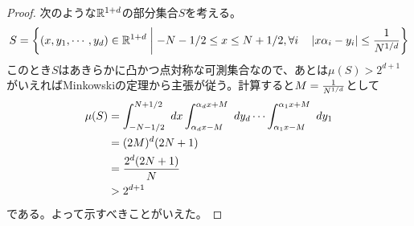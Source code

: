 \begin{proof}
次のような${\mathbb R}^{1+d}$の部分集合$S$を考える。
\[
S = \left\{ (x,y_1, \cdots , y_d) \in {\mathbb R}^{1+d} \mathrel{} \middle| \mathrel{}    -N-1/2 \leq x \leq N + 1/2, \forall i \quad  \left \lvert x {\alpha}_i - y_i \right \rvert \leq \frac{1}{N^{1/d}}  \right\}
\]
このとき$S$はあきらかに凸かつ点対称な可測集合なので、あとは$\mu(S) > 2^{d+1}$がいえればMinkowskiの定理から主張が従う。計算すると$M = \frac{1}{N^{1/d}}$として
\begin{align*}
\mu(S) &= \int_{-N-1/2}^{N+1/2} \ dx \int_{{\alpha}_d x - M}^{{\alpha}_d x + M} \ dy_d \cdots \int_{{\alpha}_1 x - M}^{{\alpha}_1 x + M} \ dy_1 \\
&= (2M)^d (2N+1) \\
&= \frac{2^d (2N+1)}{N} \\
&> 2^{d+1}
\end{align*}
である。よって示すべきことがいえた。
\end{proof}
